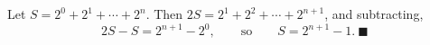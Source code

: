 Let $S=2^0+2^1+\cdots+2^n$. Then $2S=2^1+2^2+\cdots+2^{n+1}$, and subtracting,
\[2S-S=2^{n+1}-2^0,\qquad\text{so}\qquad S=2^{n+1}-1.\ \blacksquare\]
